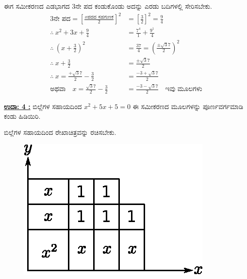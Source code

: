 ಈಗ ಸಮೀಕರಣದ ಎಡಭಾಗದ 3ನೇ ಪದ ಕಂಡುಕೊಂಡು ಅದನ್ನು ಎರಡು ಬದಿಗಳಲ್ಲಿ ಸೇರಿಸಬೇಕು. 
\begin{align*}
3\text{ನೇ ಪದ} = \left[\frac{x\text{ಪದದ ಸಹಗುಣಕ}}{2} \right]^2 & = \left[\frac{3}{2} \right]^2 = \frac{9}{4}\\
\therefore~ x^2 + 3x + \frac{9}{4} & = \frac{7^4}{1} + \frac{9^1}{4}\\
\therefore~ \left(x + \frac{3}{2} \right)^2 & = \frac{37}{4} = \left(\frac{\pm \surd37}{2} \right)^2\\
\therefore~ x + \frac{3}{2} & = \frac{\pm \surd37}{2}\\
\therefore~ x = \frac{+ \surd 37}{2} - \frac{3}{2} & = \frac{-3 + \surd37}{2}\\
\text{ಅಥವಾ}\quad x = \frac{\surd37}{2} - \frac{3}{2} & = \frac{-3 -\surd37}{2} \quad\text{ಇವು ಮೂಲಗಳು}
\end{align*}

\noindent
{\textbf{\underline{ಉದಾ: 4 :}}} ಬಿಲ್ಲೆಗಳ ಸಹಾಯದಿಂದ $x^2 + 5x + 5 = 0$ ಈ ಸಮೀಕರಣದ ಮೂಲಗಳನ್ನು ಪೂರ್ಣವರ್ಗಮಾಡಿ ಕಂಡು ಹಿಡಿಯಿರಿ. 

ಬಿಲ್ಲೆಗಳ ಸಹಾಯದಿಂದ ರೇಖಾಚಿತ್ರವನ್ನು ರಚಿಸಬೇಕು.
\begin{figure}[H]
\centering
\includegraphics[scale=0.8]{src/figure/chap3/fig3-50.eps}
\end{figure}


